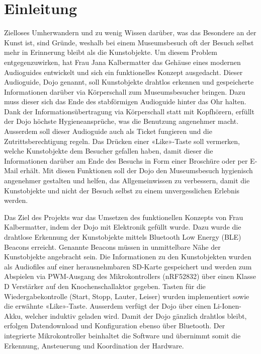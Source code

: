 \section{Einleitung}\label{sec:einleitung}

Zielloses Umherwandern und zu wenig Wissen darüber, was das Besondere an der Kunst ist, sind Gründe, weshalb bei einem Museumsbesuch oft der Besuch selbst mehr in Erinnerung bleibt als die Kunstobjekte. Um diesem Problem entgegenzuwirken, hat Frau Jana Kalbermatter das Gehäuse eines modernen Audioguides entwickelt und sich ein funktionelles Konzept ausgedacht. Dieser Audioguide, Dojo genannt, soll Kunstobjekte drahtlos erkennen und gespeicherte Informationen darüber via Körperschall zum Museumsbesucher bringen. Dazu muss dieser sich das Ende des stabförmigen Audioguide hinter das Ohr halten. Dank der Informationsübertragung via Körperschall statt mit Kopfhörern, erfüllt der Dojo höchste Hygieneansprüche, was die Benutzung angenehmer macht. Ausserdem soll dieser Audioguide auch als Ticket fungieren und die Zutrittsberechtigung regeln. Das Drücken einer «Like»-Taste soll vermerken, welche Kunstobjekte dem Besucher gefallen haben, damit dieser die Informationen darüber am Ende des Besuchs in Form einer Broschüre oder per E-Mail erhält. Mit diesen Funktionen soll der Dojo den Museumsbesuch hygienisch angenehmer gestalten und helfen, das Allgemeinwissen zu verbessern, damit die Kunstobjekte und nicht der Besuch selbst zu einem unvergesslichen Erlebnis werden.

Das Ziel des Projekts war das Umsetzen des funktionellen Konzepts von Frau Kalbermatter, indem der Dojo mit Elektronik gefüllt wurde. Dazu wurde die drahtlose Erkennung der Kunstobjekte mittels Bluetooth Low Energy (BLE) Beacons erreicht. Genannte Beacons müssen in unmittelbare Nähe der Kunstobjekte angebracht sein. Die Informationen zu den Kunstobjekten wurden als Audiofiles auf einer herausnehmbaren SD-Karte gespeichert und werden zum Abspielen via PWM-Ausgang des Mikrokontrollers (nRF52832) über einen Klasse D Verstärker auf den Knochenschallaktor gegeben. Tasten für die Wiedergabekontrolle (Start, Stopp, Lauter, Leiser) wurden implementiert sowie die erwähnte «Like»-Taste. Ausserdem verfügt der Dojo über einen Li-Ionen-Akku, welcher induktiv geladen wird. Damit der Dojo gänzlich drahtlos bleibt, erfolgen Datendownload und Konfiguration ebenso über Bluetooth. Der integrierte Mikrokontroller beinhaltet die Software und übernimmt somit die Erkennung, Ansteuerung und Koordination der Hardware.

